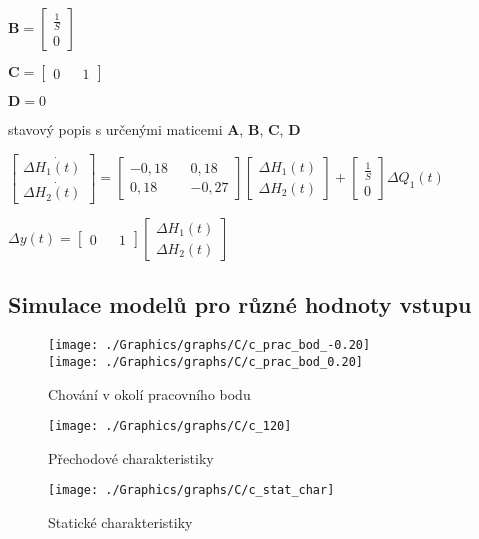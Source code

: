 \documentclass{article}
\begin{document}
\begin{center}
			\bigskip

			$\textbf{B}=\begin{bmatrix}
			\frac{1}{S}\\
			0
			\end{bmatrix}$

			\bigskip

			$\textbf{C}=\begin{bmatrix}
			0 && 1
			\end{bmatrix}$

			\bigskip

			$\textbf{D}=0$

			\bigskip

			stavový popis s určenými maticemi \textbf{A}, \textbf{B}, \textbf{C}, \textbf{D}

			\bigskip

			$\begin{bmatrix}
			\Delta \dot{H_1(t)}\\
			\Delta \dot{H_2(t)}
			\end{bmatrix}=\begin{bmatrix}
			-0,18 && 0,18\\
			0,18&& -0,27
			\end{bmatrix}\begin{bmatrix}
			\Delta H_1(t)\\
			\Delta H_2(t)
			\end{bmatrix}+\begin{bmatrix}
			\frac{1}{S}\\
			0
			\end{bmatrix}\Delta Q_1(t)$

			\bigskip

			$\Delta y(t)=\begin{bmatrix}
			0 && 1
			\end{bmatrix}\begin{bmatrix}
			\Delta H_1(t)\\
			\Delta H_2(t)
			\end{bmatrix}$
			\end{center}

		\subsection{Simulace modelů pro různé hodnoty vstupu}
			\begin{figure}[H]
				\centering
				\texttt{[image: ./Graphics/graphs/C/c\_prac\_bod\_-0.20]}\\
				\texttt{[image: ./Graphics/graphs/C/c\_prac\_bod\_0.20]}
				\caption{Chování v okolí pracovního bodu}
			\end{figure}
			\begin{figure}[H]
				\centering
				\texttt{[image: ./Graphics/graphs/C/c\_120]}
				\caption{Přechodové charakteristiky}
			\end{figure}
			\begin{figure}[H]
				\texttt{[image: ./Graphics/graphs/C/c\_stat\_char]}
				\caption{Statické charakteristiky}
			\end{figure}
\end{document}
